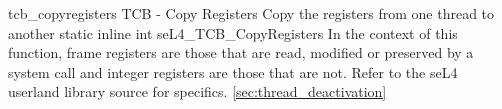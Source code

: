 %
%
%
%

\apidoc
{tcb_copyregisters}
{TCB - Copy Registers}
{Copy the registers from one thread to another}
{static inline int seL4\_TCB\_CopyRegisters }
{
}
{\errorenumdesc}
{In the context of this function, frame registers are those that are read, modified or preserved by a system call and integer registers are those that are not. Refer to the seL4 userland library source for specifics. \autoref{sec:thread_deactivation}}
